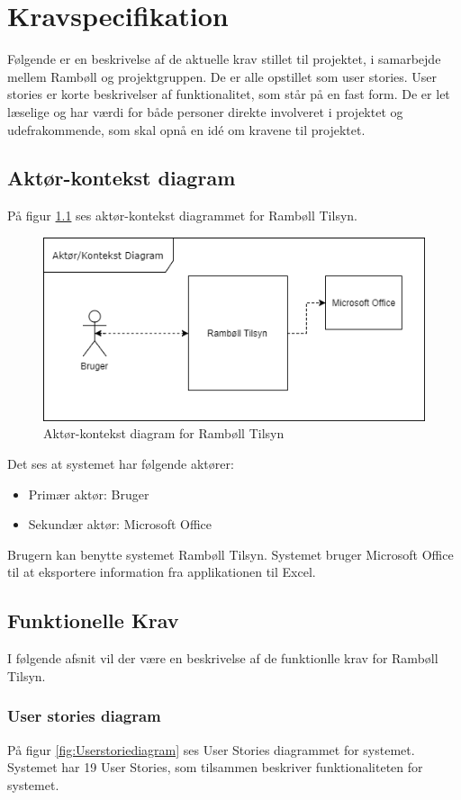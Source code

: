 \chapter{Kravspecifikation}

Følgende er en beskrivelse af de aktuelle krav stillet til projektet, i samarbejde mellem Rambøll og projektgruppen. De er alle opstillet som user stories. User stories er korte beskrivelser af funktionalitet, som står på en fast form. De er let læselige og har værdi for både personer direkte involveret i projektet og udefrakommende, som skal opnå en idé om kravene til projektet. 

\section{Aktør-kontekst diagram}\label{sec:Aktor}
	På figur \ref{fig:AktorKontekst} ses aktør-kontekst diagrammet for Rambøll Tilsyn. 
\begin{figure}[H]
	\centering
	\includegraphics[width=0.6\linewidth]{FunktionelleKrav/AktorDiagram}
	\caption{Aktør-kontekst diagram for Rambøll Tilsyn}
	\label{fig:AktorKontekst}
\end{figure}
Det ses at systemet har følgende aktører:
\begin{itemize}
	\item Primær aktør: Bruger
	\item Sekundær aktør: Microsoft Office \\
\end{itemize}

Brugern kan benytte systemet Rambøll Tilsyn. Systemet bruger Microsoft Office til at eksportere information fra applikationen til Excel.

\clearpage

\section{Funktionelle Krav} \label{sec:UserStories}
I følgende afsnit vil der være en beskrivelse af de funktionlle krav for Rambøll Tilsyn.

\subsection{User stories diagram}
På figur \ref{fig:Userstoriediagram} ses User Stories diagrammet for systemet. Systemet har 19 User Stories, som tilsammen beskriver funktionaliteten for systemet. \\

